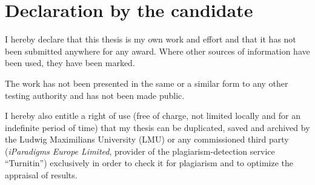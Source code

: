 %
%

\section*{Declaration by the candidate}

I hereby declare that this thesis is my own work and effort and that it has not been submitted anywhere for any award. Where other sources of information have been used, they have been marked.

\bigskip

The work has not been presented in the same or a similar form to any other testing authority and has not been made public.

\bigskip

I hereby also entitle a right of use (free of charge, not limited locally and for an indefinite period of time) that my thesis can be duplicated, saved and archived by the Ludwig Maximilians University (LMU) or any commissioned third party (\eg \emph{iParadigms Europe Limited}, provider of the plagiarism-detection service \enquote{Turnitin}) exclusively in order to check it for plagiarism and to optimize the appraisal of results.

